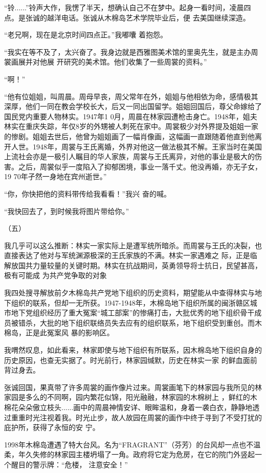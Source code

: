 \documentclass{article}
\begin{document}
“铃......”铃声大作，我愣了半天，想确认自己不在梦中。起身一看时间，凌晨四点。是张诚的越洋电话。张诚从木棉岛艺术学院毕业后，便
去美国继续深造。 

“老兄啊，现在是北京时间四点正。”我嘟囔
着抱怨。 

“我实在等不及了，太兴奋了。我身边就是西雅图美术馆的里奥先生，就是主办周裳画展并对他展
开研究的美术馆。他们收集了一些周裳的资料。” 


“啊！” 

“他有位姐姐，叫周晨。周母早丧，周父常年在外，姐姐与他相依为命，感情极其深厚，他们一同在教会学校长大，后又一同出国留学。姐姐回国后，尊父命嫁给了国民党内重要人物林实。1947年1
\newpage
0月，周晨在林家园遭枪击身亡。1948年，姐夫林实在重庆失踪，年仅8岁的外甥被人刺死在家中。周裳极少对外界提及姐姐一家的惨剧。姐姐去世后，他曾为姐姐画了一幅肖像画，这幅画一直跟随着他直到他离开人世。1948年，周裳与王氏离婚，外界对他这一做法极其不解。王家当时在美国上流社会亦是一极引人瞩目的华人家族，周裳与王氏离异，对他的事业是极大的伤害。之后，周裳似乎一度陷入了抑郁困境，事业一落千丈。他没再婚，亦无子女，19
70年孑然一身地在宾州逝世。” 

“你，你快把他的资料带传给我看看！”我兴
奋的喊。 


“我快回去了，到时候我将图片带给你。” 


（五） 

我几乎可以这么推断：林实一家实际上是遭军统所暗杀。而周裳与王氏的决裂，也直接表达了他对与军统渊源极深的王氏家族的不满。林实一家遇难之
\newpage
际，正是临解放国共力量较量的关键时期。林实在抗战期间，英勇领导将士抗日，民望甚高，极有可能成
为共产党争取的对象 

我四处搜寻解放前夕木棉岛共产党地下组织的历史资料，期望能从中查得林实与地下组织的联系，但却一无所获。1947-1948年，木棉岛地下组织所属的闽浙赣区城市地下党组织经历了重大冤案“城工部案”的惨痛打击，大批优秀的地下组织骨干成员被错杀，大批的地下组织联络员失去应有的组织联系，地下组织受到重创。而木棉岛，正是此冤案风
暴的影响区。 

我喟然叹息，如此看来，林家即使与地下组织有所联系，因木棉岛地下组织自身的历史原因，也查无实据了。时光前行，林家园缄默，历史在林实一家
的鲜血面前背过身去。 

张诚回国，果真带了许多周裳的画作像片过来。周裳画笔下的林家园与我所见的林家园是多么的不同啊，园内繁花似锦，阳光融融，林家园的木棉树上
\newpage
，鲜红的木棉花朵朵傲立枝头......画中的周晨神情安详、眼眸温和，身着一袭白衣，静静地透过重重时光注视着我。时光止步，故人故园在周裳的画作中终于寻到了不受打扰的庇护所，获得了永恒的安
宁。 

1998年木棉岛遭遇了特大台风。名为“FRAGRANT”（芬芳）的台风却一点也不温柔，年久失修的林家园主楼坍塌了一角。政府将它定为危房，在它的院门外竖起一个醒目的警示牌：“危楼，
注意安全！” 
\end{document}
